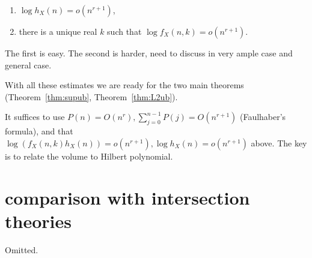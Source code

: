 \begin{prp}
  \begin{enumerate}
    \item $\log h_{X}(n)=o(n^{r+1})$,
    \item there is a unique real $k$ such that $\log f_{X}(n,k)=o(n^{r+1})$.
  \end{enumerate}
\end{prp}
\begin{rmk}
  The first is easy. The second is harder, need to discuss in very ample case and general case.

  With all these estimates we are ready for the two main theorems (Theorem~\ref{thm:supub}, Theorem~\ref{thm:L2ub}).
\end{rmk}


\begin{prf}
  It suffices to use $P(n)=O(n^{r}), \sum_{j=0}^{n-1}P(j)=O(n^{r+1})$ (Faulhaber's formula), and that $\log(f_{X}(n,k)h_{X}(n))=o(n^{r+1}), \log h_{X}(n)=o(n^{r+1})$ above. The key is to relate the volume to Hilbert polynomial.
\end{prf}



\section{comparison with intersection theories}

Omitted.









